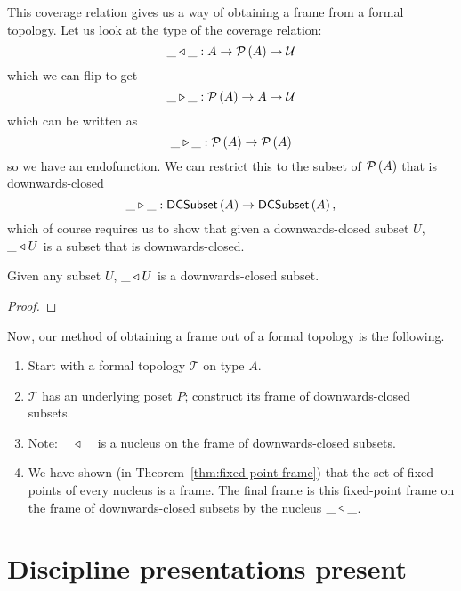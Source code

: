 This coverage relation gives us a way of obtaining a frame from a formal topology. Let us
look at the type of the coverage relation:
\begin{equation*}
  \_\triangleleft{}\_ : A \rightarrow \mathcal{P}\left(A\right) \rightarrow \mathcal{U}{}
\end{equation*}
which we can flip to get
\begin{equation*}
  \_\triangleright\_ : \mathcal{P}\left(A\right) \rightarrow A \rightarrow \mathcal{U}{}
\end{equation*}
which can be written as
\begin{equation*}
  \_\triangleright\_ : \mathcal{P}\left(A\right) \rightarrow \mathcal{P}\left(A\right)
\end{equation*}
so we have an endofunction. We can restrict this to the subset of $\mathcal{P}\left(A\right)$ that is
downwards-closed
\begin{equation*}
  \_\triangleright\_ : \mathsf{DCSubset}{}\left(A\right) \rightarrow \mathsf{DCSubset}{}\left(A\right),
\end{equation*}
which of course requires us to show that given a downwards-closed subset $U$,
$\_ \triangleleft{} U$ is a subset that is downwards-closed.

\begin{thm}
  Given any subset $U$, $\_ \triangleleft{} U$ is a downwards-closed subset.
\end{thm}
\begin{proof}
\end{proof}

Now, our method of obtaining a frame out of a formal topology is the following.
\begin{enumerate}
  \item Start with a formal topology $\mathcal{T}$ on type $A$.
  \item $\mathcal{T}$ has an underlying poset $P$; construct its frame of downwards-closed
    subsets.
  \item Note: $\_ \triangleleft{} \_$ is a nucleus on the frame of downwards-closed subsets.
  \item We have shown (in Theorem~\ref{thm:fixed-point-frame}) that the set of
    fixed-points of every nucleus is a frame. The final frame is this fixed-point frame
    on the frame of downwards-closed subsets by the nucleus $\_ \triangleleft{} \_$.
\end{enumerate}

\section{Discipline presentations present}

